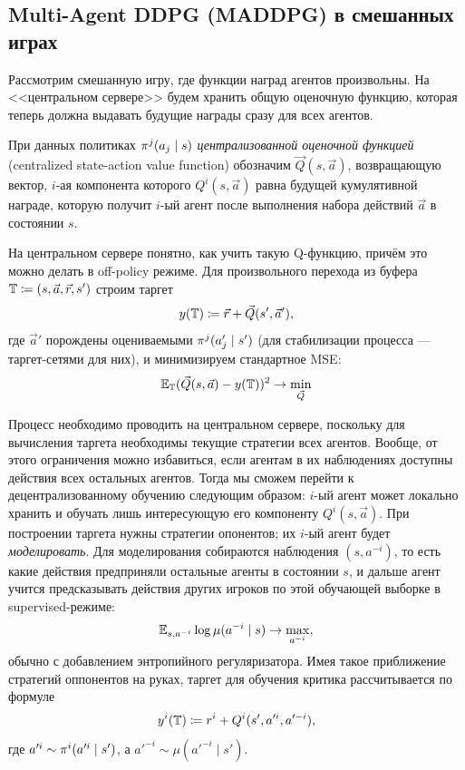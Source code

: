 \subsection{Multi-Agent DDPG (MADDPG) в смешанных играх}

Рассмотрим смешанную игру, где функции наград агентов произвольны. На <<центральном сервере>> будем хранить общую оценочную функцию, которая теперь должна выдавать будущие награды сразу для всех агентов. 

\begin{definition}
При данных политиках $\pi^j(a_j \HM\mid s)$ \emph{централизованной оценочной функцией} (centralized state-action value function)  обозначим $\vec{Q}(s, \vec{a})$, возвращающую вектор, $i$-ая компонента которого $Q^i(s, \vec{a})$ равна будущей кумулятивной награде, которую получит $i$-ый агент после выполнения набора действий $\vec{a}$ в состоянии $s$.
\end{definition}

На центральном сервере понятно, как учить такую Q-функцию, причём это можно делать в off-policy режиме. Для произвольного перехода из буфера $\mathbb{T} \coloneqq (s, \vec{a}, \vec{r}, s')$ строим таргет
$$y(\mathbb{T}) \coloneqq \vec{r} + \vec{Q}(s', \vec{a}'),$$
где $\vec{a}'$ порождены оцениваемыми $\pi^j(a'_j \HM\mid s')$ (для стабилизации процесса --- таргет-сетями для них), и минимизируем стандартное MSE:
$$\mathbb{E}_{\mathbb{T}} (\vec{Q}(s, \vec{a}) - y(\mathbb{T}))^2 \to \min_{\vec{Q}}$$

Процесс необходимо проводить на центральном сервере, поскольку для вычисления таргета необходимы текущие стратегии всех агентов. Вообще, от этого ограничения можно избавиться, если агентам в их наблюдениях доступны действия всех остальных агентов. Тогда мы сможем перейти к децентрализованному обучению следующим образом: $i$-ый агент может локально хранить и обучать лишь интересующую его компоненту $Q^i(s, \vec{a})$. При построении таргета нужны стратегии опонентов; их $i$-ый агент будет \emph{моделировать}. Для моделирования собираются наблюдения $(s, a^{-i})$, то есть какие действия предприняли остальные агенты в состоянии $s$, и дальше агент учится предсказывать действия других игроков по этой обучающей выборке в supervised-режиме:
$$\mathbb{E}_{s, a^{-i}} \log \mu(a^{-i} \mid s) \to \max_{a^{-i}},$$
обычно с добавлением энтропийного регуляризатора. Имея такое приближение стратегий оппонентов на руках, таргет для обучения критика рассчитывается по формуле
$$y^i(\mathbb{T}) \coloneqq r^i + Q^i(s', a'^i, a'^{-i}),$$
где $a'^i \HM\sim \pi^i(a'^i \mid s')$, а $a'^{-i} \sim \mu(a'^{-i} \mid s')$.

